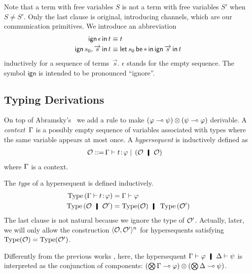 Note that a term with free variables $S$ is not a term with free
variables $S'$ when $S\neq S'$.  Only the last clause is original,
introducing channels, which are our communication primitives.
We introduce an abbreviation
\begin{align*}
 \mathsf{ign }\,{\epsilon}\,\mathsf{ in }\,{t}   & \equiv t\\
 \mathsf{ign }\,{s_0,\overrightarrow s}\,\mathsf{ in }\,{t} & \equiv \mathsf{let }\,{s_0}\,\mathsf{ be }\,{\ast}\,\mathsf{ in }\,{\mathsf{ign }\,{\overrightarrow s}\,\mathsf{ in }\,{t}}
\end{align*}
inductively for a sequence of terms~$\vec s$.
$\epsilon$ stands for the empty sequence.
The symbol $\mathsf{ign}$ is intended to be pronounced ``ignore''.

\subsection{Typing Derivations}

On top of Abramsky's~\citep{abramsky1993computational} we add a rule to
make $(\varphi\multimap\psi)\otimes(\psi\multimap\varphi)$ derivable.
A \textit{context}~$\Gamma$ is a possibly empty sequence of
variables associated with
types where the same variable appears at most once.
A \textit{hypersequent} is inductively defined as
\begin{align*}
 \hypert ::=\, &\G\tr\tj{t}{\phi}
 \mid\, (\hypert\hmid \hypert)
\end{align*}
where $\Gamma$ is a context.

The \textit{type} of a hypersequent is
defined inductively.
\begin{align*}
 \type{(\G\tr\tj{t}\phi)}&= \G\tr\phi \\
 \type{(\hypert \hmid \hypert')}&= \type(\hypert)\hmid\type{(\hypert')}
\end{align*}
The last clause is not natural because we ignore the type of $\mathcal{O}'$.
Actually, later, we will only allow the construction
$\langle{\mathcal{O},\mathcal{O}'}\rangle^n$ for hypersequents satisfying
$\operatorname{Type}(\mathcal{O}) = \operatorname{Type}(\mathcal{O}')$.

Differently from the previous works ,
here, the hypersequent $\G\tr\phi\hmid \D\tr\psi$ is interpreted as the
conjunction of components:
$(\bigotimes\Gamma\multimap\varphi)\otimes (\bigotimes\Delta\multimap\psi)$.

